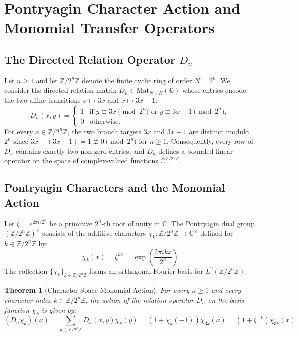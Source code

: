 \documentclass[11pt,reqno]{article}
\theoremstyle{plain}
\newtheorem{theorem}{Theorem}[section]
\theoremstyle{definition}
\theoremstyle{remark}
\newcommand{\Z}{\mathbb{Z}}
\newcommand{\Q}{\mathbb{Q}}
\newcommand{\C}{\mathbb{C}}
\begin{document}
\section{Pontryagin Character Action and Monomial Transfer Operators}

\subsection{The Directed Relation Operator $D_n$}

Let $n \ge 1$ and let $\Z/2^n\Z$ denote the finite cyclic ring of order $N = 2^n$. We consider the directed relation matrix $D_n \in \mathrm{Mat}_{N \times N}(\Q)$ whose entries encode the two affine transitions $x \mapsto 3x$ and $x \mapsto 3x - 1$:
\[
D_n(x, y) = \begin{cases} 1 & \text{if } y \equiv 3x \pmod{2^n} \text{ or } y \equiv 3x - 1 \pmod{2^n}, \\ 0 & \text{otherwise.} \end{cases}
\]
For every $x \in \Z/2^n\Z$, the two branch targets $3x$ and $3x - 1$ are distinct modulo $2^n$ since $3x - (3x - 1) = 1 \not\equiv 0 \pmod{2^n}$ for $n \ge 1$. Consequently, every row of $D_n$ contains exactly two non-zero entries, and $D_n$ defines a bounded linear operator on the space of complex-valued functions $\C^{\Z/2^n\Z}$.

\subsection{Pontryagin Characters and the Monomial Action}

Let $\zeta = e^{2\pi i / 2^n}$ be a primitive $2^n$-th root of unity in $\C$. The Pontryagin dual group $(\Z/2^n\Z)^\vee$ consists of the additive characters $\chi_k \colon \Z/2^n\Z \to \C^\times$ defined for $k \in \Z/2^n\Z$ by:
\[
\chi_k(x) = \zeta^{k x} = \exp\left(\frac{2\pi i k x}{2^n}\right)
\]
The collection $\{\chi_k\}_{k \in \Z/2^n\Z}$ forms an orthogonal Fourier basis for $L^2(\Z/2^n\Z)$.

\begin{theorem}[Character-Space Monomial Action]
\label{thm:char_action}
For every $n \ge 1$ and every character index $k \in \Z/2^n\Z$, the action of the relation operator $D_n$ on the basis function $\chi_k$ is given by:
\[
(D_n \chi_k)(x) = \sum_{y \in \Z/2^n\Z} D_n(x, y) \chi_k(y) = (1 + \chi_k(-1)) \chi_{3k}(x) = (1 + \zeta^{-k}) \chi_{3k}(x)
\]
\end{theorem}
\end{document}
